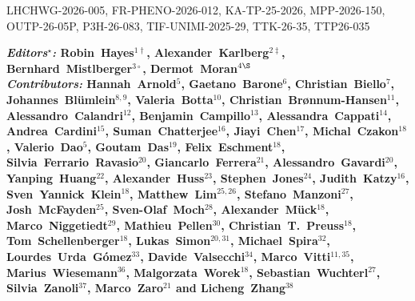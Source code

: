 \documentclass{SciPost_better_arXiv}
\begin{document}

\pagestyle{SPstyle}
\begin{flushright}
LHCHWG-2026-005, FR-PHENO-2026-012, KA-TP-25-2026, MPP-2026-150, OUTP-26-05P, P3H-26-083, TIF-UNIMI-2025-29, TTK-26-35, TTP26-035
\end{flushright}
\begin{center}{\Large \textbf{\color{scipostdeepblue}{
Predictions for Inclusive Production Cross Sections of the Higgs~Boson at the LHC and HL-LHC\\
}}}\end{center}

\begin{center}\textbf{
    {\it Editors$^\star$:} Robin~Hayes$^{1\dagger}$, Alexander~Karlberg$^{2\ddagger}$, Bernhard~Mistlberger$^{3\circ}$,
    Dermot~Moran$^{4\S}$\\[0.3cm]
%
    {\it Contributors:}
    Hannah~Arnold$^{5}$,
    Gaetano~Barone$^{6}$,
    Christian~Biello$^{7}$,
    Johannes~Bl\"umlein$^{8,9}$,
    Valeria~Botta$^{10}$,
    Christian~Br{\o}nnum-Hansen$^{11}$,
    Alessandro~Calandri$^{12}$,
    Benjamin~Campillo$^{13}$,
    Alessandra~Cappati$^{14}$,
    Andrea~Cardini$^{15}$,
    Suman~Chatterjee$^{16}$,
    Jiayi~Chen$^{17}$,
    Michal~Czakon$^{18}$,
    Valerio~Dao$^{5}$,
    Goutam~Das$^{19}$,
    Felix~Eschment$^{18}$,
    Silvia~Ferrario~Ravasio$^{20}$,
    Giancarlo~Ferrera$^{21}$,
    Alessandro~Gavardi$^{20}$,
    Yanping~Huang$^{22}$,
    Alexander~Huss$^{23}$,
    Stephen~Jones$^{24}$,
    Judith~Katzy$^{16}$,
    Sven~Yannick~Klein$^{18}$,
    Matthew~Lim$^{25,26}$,
    Stefano~Manzoni$^{27}$,
    Josh~McFayden$^{25}$,
    Sven-Olaf~Moch$^{28}$,
    Alexander~M\"uck$^{18}$,
    Marco~Niggetiedt$^{29}$,
    Mathieu~Pellen$^{30}$,
    Christian~T.~Preuss$^{18}$,
    Tom~Schellenberger$^{18}$,
    Lukas~Simon$^{20,31}$,
    Michael~Spira$^{32}$,
    Lourdes~Urda~G\'omez$^{33}$,
    Davide~Valsecchi$^{34}$,
    Marco~Vitti$^{11,35}$,
    Marius~Wiesemann$^{36}$,
    Malgorzata~Worek$^{18}$,
    Sebastian~Wuchterl$^{27}$,
    Silvia~Zanoli$^{37}$,
    Marco~Zaro$^{21}$ and
    Licheng~Zhang$^{38}$
}\end{center}
\end{document}
